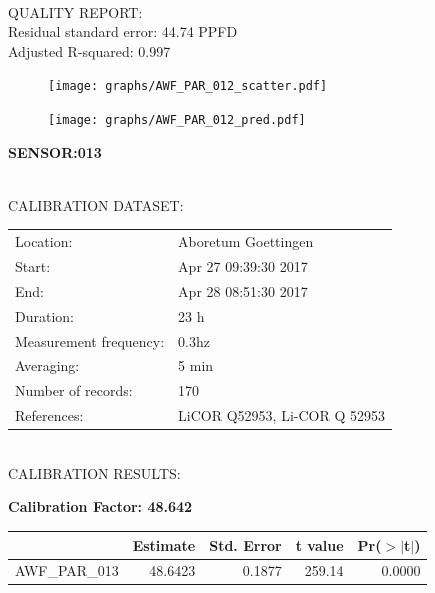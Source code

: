 \documentclass[oneside]{report}
\begin{document}
\hrulefill\\
QUALITY REPORT:\\
Residual standard error: 44.74 PPFD\\
Adjusted R-squared: 0.997



\begin{figure}[H]
  \centering
  \texttt{[image: graphs/AWF\_PAR\_012\_scatter.pdf]}
\end{figure}




\begin{figure}[H]
  \centering
  \texttt{[image: graphs/AWF\_PAR\_012\_pred.pdf]}
\end{figure}

\pagebreak


\begin{center}
\large{\textbf{SENSOR:013}}\\
\end{center}

\hrulefill\\
CALIBRATION DATASET:\\
\begin{table}[h!]
  \centering
  \label{tab:table1}
  \begin{tabular}{ll}
    Location: & Aboretum Goettingen\\ 
    
    
    Start:  & Apr 27 09:39:30 2017 \\
    End:   & Apr 28 08:51:30 2017\\ 
    Duration: & 23 h\\
    Measurement frequency: & 0.3hz\\
    Averaging:  &5 min\\
    Number of records: & 170 \\
    References: & LiCOR Q52953, Li-COR Q 52953 \\
  \end{tabular}
\end{table}

\hrulefill\\
CALIBRATION RESULTS:\\


\begin{center}
\textbf{\large{Calibration Factor: 48.642}}\\
\end{center}
\begin{table}[ht]
\centering
\begin{tabular}{rrrrr}
  \hline
 & Estimate & Std. Error & t value & Pr($>$$|$t$|$) \\ 
  \hline
AWF\_PAR\_013 & 48.6423 & 0.1877 & 259.14 & 0.0000 \\ 
   \hline
\end{tabular}
\end{table}
\end{document}
